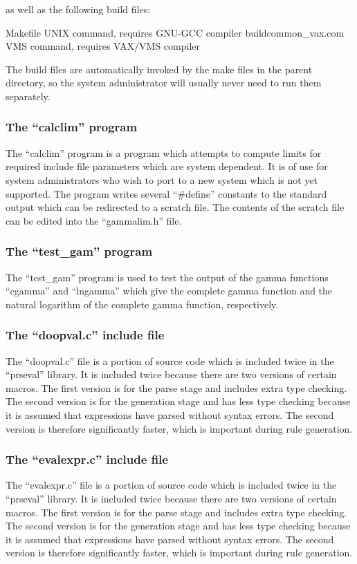 as well as the following build files:
\begin{codeexample}
Makefile             {\scriptsize UNIX command, requires GNU-GCC compiler}
buildcommon_vax.com  {\scriptsize VMS command, requires VAX/VMS compiler}
\end{codeexample}
The build files are automatically invoked by the make files in the
parent directory, so the system administrator will usually never need to
run them separately.

\subsubsection{The ``calclim'' program}
\label{sec:calclim}
The ``calclim'' program is a program which attempts to compute
limits for required include file parameters which are system dependent.
It is of use for system administrators who wish to port to a new
system which is not yet supported.   The program writes several ``\#define''
constants to the standard output which can be redirected to a scratch file.
The contents of the scratch file can be edited into the ``gammalim.h'' file.

\subsubsection{The ``test\_gam'' program}
\label{sec:testgam}

The ``test\_gam'' program is used to test the output of the gamma functions
``cgamma'' and ``lngamma'' which give the complete gamma function and the
natural logarithm of the complete gamma function, respectively.

\subsubsection{The ``doopval.c'' include file}
\label{sec:doopval}
The ``doopval.c'' file
is a portion of source code which is included
twice in the ``prseval'' library.   It is included twice because there
are two versions of certain macros.   The first version is for the parse
stage and includes extra type checking.   The second version is for the
generation stage and has less type checking because it is assumed that
expressions have parsed without syntax errors.   The second version is
therefore significantly faster, which is important during rule generation.

\subsubsection{The ``evalexpr.c'' include file}
\label{sec:evalexpr}
The ``evalexpr.c'' file
is a portion of source code which is included
twice in the ``prseval'' library.   It is included twice because there
are two versions of certain macros.   The first version is for the parse
stage and includes extra type checking.   The second version is for the
generation stage and has less type checking because it is assumed that
expressions have parsed without syntax errors.   The second version is
therefore significantly faster, which is important during rule generation.

